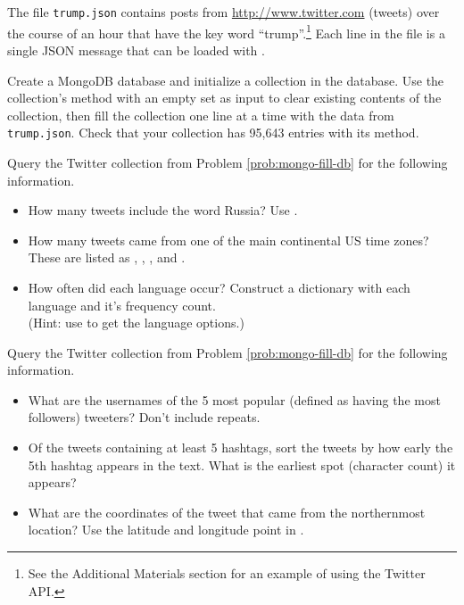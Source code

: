 The file \texttt{trump.json} contains posts from \url{http://www.twitter.com} (tweets) over the course of an hour that have the key word ``trump''.\footnote{See the Additional Materials section for an example of using the Twitter API.}
Each line in the file is a single JSON message that can be loaded with .

Create a MongoDB database and initialize a collection in the database.
Use the collection's  method with an empty set as input to clear existing contents of the collection, then fill the collection one line at a time with the data from \texttt{trump.json}.
Check that your collection has 95,643 entries with its  method.
\label{prob:mongo-fill-db}

Query the Twitter collection from Problem \ref{prob:mongo-fill-db} for the following information.
\begin{itemize}
    \item How many tweets include the word Russia? Use .
    \item How many tweets came from one of the main continental US time zones? These are listed as , , , and .
    \item How often did each language occur? Construct a dictionary with each language and it's frequency count.
    \\(Hint: use  to get the language options.)
\end{itemize}

Query the Twitter collection from Problem \ref{prob:mongo-fill-db} for the following information.
\begin{itemize}
    \item What are the usernames of the 5 most popular (defined as having the most followers) tweeters? Don't include repeats.
    \item Of the tweets containing at least 5 hashtags, sort the tweets by how early the 5th hashtag appears in the text.
    What is the earliest spot (character count) it appears?
    \item What are the coordinates of the tweet that came from the northernmost location?
    Use the latitude and longitude point in .
\end{itemize}

